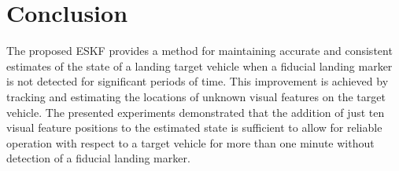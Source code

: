 \section{Conclusion} \label{sec:est_paper_conclusion}
The proposed ESKF provides a method for maintaining accurate and consistent
estimates of the state of a landing target vehicle when a fiducial landing marker is
not detected for significant periods of time. This improvement is achieved by
tracking and estimating the locations of unknown visual features on the target
vehicle.
The presented experiments demonstrated that the addition of just ten visual
feature positions to the estimated state
is sufficient to allow for reliable operation with respect to a target vehicle
for more than one
minute without detection of a fiducial landing marker.
